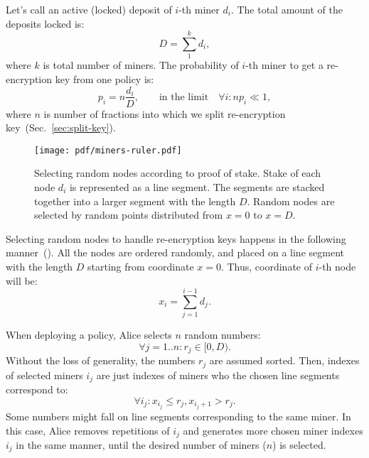 \documentclass[longbibliography,nofootinbib]{revtex4-1}
\begin{document}
\begin{CJK*}{UTF8}{gbsn}
Let's call an active (locked) deposit of $i$-th miner $d_i$.
The total amount of the deposits locked is:
\begin{equation}
    D = \sum_1^k d_i,
\end{equation}
where $k$ is total number of miners.
The probability of $i$-th miner to get a re-encryption key from one policy is:
\begin{equation}
    p_i = n\frac{d_i}{D},\qquad\text{in the limit}\quad \forall i: n p_i \ll 1,
\end{equation}
where $n$ is number of fractions into which we split re-encryption key~(Sec.~\ref{sec:split-key}).

\begin{figure}
    \centering
    \texttt{[image: pdf/miners-ruler.pdf]}
    \caption{Selecting random nodes according to proof of stake.
             Stake of each node $d_i$ is represented as a line segment.
             The segments are stacked together into a larger segment with the length $D$.
             Random nodes are selected by random points distributed from $x=0$ to $x=D$.}
    \label{fig:random-nodes}
\end{figure}

Selecting random nodes to handle re-encryption keys happens in the following manner~().
All the nodes are ordered randomly, and placed on a line segment with the length $D$ starting from coordinate $x=0$.
Thus, coordinate of $i$-th node will be:
\begin{equation}
    x_i = \sum_{j=1}^{i-1} d_j.
\end{equation}

When deploying a policy, Alice selects $n$ random numbers:
\begin{equation}
    \forall j=1..n: r_j \in [0, D).
\end{equation}
Without the loss of generality, the numbers $r_j$ are assumed sorted.
Then, indexes of selected miners $i_j$ are just indexes of miners who the chosen line segments correspond to:
\begin{equation}
    \forall i_j: x_{i_j} \le r_j, x_{i_j + 1} > r_j.
\end{equation}
Some numbers might fall on line segments corresponding to the same miner.
In this case, Alice removes repetitions of $i_j$ and generates more chosen miner indexes $i_j$ in the same manner, until the desired number of miners ($n$) is
selected.


\end{CJK*}
\end{document}
